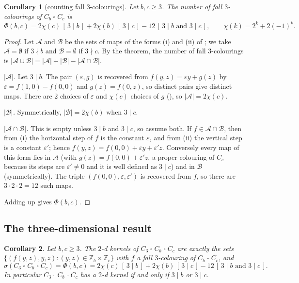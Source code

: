 \documentclass[11pt]{article}
\theoremstyle{plain}
\newtheorem{corollary}[corollary]{Corollary}
\theoremstyle{definition}
\theoremstyle{remark}
\newcommand{\Z}{\mathbb{Z}}
\newcommand{\T}{\mathbin{\square}}
\newcommand{\Iv}[1]{[\,#1\,]}
\begin{document}
\begin{corollary}[counting fall $3$-colourings]\label{cor:fall-count}
Let $b, c \ge 3$. The number of fall $3$-colourings of $C_b \T C_c$ is
\[
\Phi(b,c) = 2\chi(c)\,\Iv{3 \mid b} + 2\chi(b)\,\Iv{3 \mid c}
- 12\,\Iv{3 \mid b \text{ and } 3 \mid c}, \qquad \chi(k) = 2^k + 2(-1)^k .
\]
\end{corollary}

\begin{proof}
Let $\mathcal{A}$ and $\mathcal{B}$ be the sets of maps of the forms (i) and (ii) of
; we take $\mathcal{A} = \emptyset$ if $3 \nmid b$ and
$\mathcal{B} = \emptyset$ if $3 \nmid c$. By the theorem, the number of fall $3$-colourings is
$|\mathcal{A} \cup \mathcal{B}| = |\mathcal{A}| + |\mathcal{B}| - |\mathcal{A} \cap
\mathcal{B}|$.

\emph{$|\mathcal{A}|$.} Let $3 \mid b$. The pair $(\varepsilon, g)$ is recovered from
$f(y,z) = \varepsilon y + g(z)$ by $\varepsilon = f(1, 0) - f(0,0)$ and $g(z) = f(0, z)$, so
distinct pairs give distinct maps. There are $2$ choices of $\varepsilon$ and $\chi(c)$ choices
of $g$ (), so $|\mathcal{A}| = 2\chi(c)$.

\emph{$|\mathcal{B}|$.} Symmetrically, $|\mathcal{B}| = 2\chi(b)$ when $3 \mid c$.

\emph{$|\mathcal{A} \cap \mathcal{B}|$.} This is empty unless $3 \mid b$ and $3 \mid c$, so
assume both. If $f \in \mathcal{A} \cap \mathcal{B}$, then from (i) the horizontal step of $f$
is the constant $\varepsilon$, and from (ii) the vertical step is a constant $\varepsilon'$;
hence $f(y,z) = f(0,0) + \varepsilon y + \varepsilon' z$. Conversely every map of this form
lies in $\mathcal{A}$ (with $g(z) = f(0,0) + \varepsilon' z$, a proper colouring of $C_c$
because its steps are $\varepsilon' \ne 0$ and it is well defined as $3 \mid c$) and in
$\mathcal{B}$ (symmetrically). The triple $(f(0,0), \varepsilon, \varepsilon')$ is recovered
from $f$, so there are $3 \cdot 2 \cdot 2 = 12$ such maps.

Adding up gives $\Phi(b,c)$.
\end{proof}

\subsection{The three-dimensional result}

\begin{corollary}\label{cor:3d}
Let $b, c \ge 3$. The $2$-d kernels of $C_3 \T C_b \T C_c$ are exactly the sets
$\{(f(y,z), y, z) : (y,z) \in \Z_b \times \Z_c\}$ with $f$ a fall $3$-colouring of
$C_b \T C_c$, and
\[
\sigma(C_3 \T C_b \T C_c) = \Phi(b,c) = 2\chi(c)\,\Iv{3 \mid b} + 2\chi(b)\,\Iv{3 \mid c}
- 12\,\Iv{3 \mid b \text{ and } 3 \mid c} .
\]
In particular $C_3 \T C_b \T C_c$ has a $2$-d kernel if and only if $3 \mid b$ or $3 \mid c$.
\end{corollary}
\end{document}
